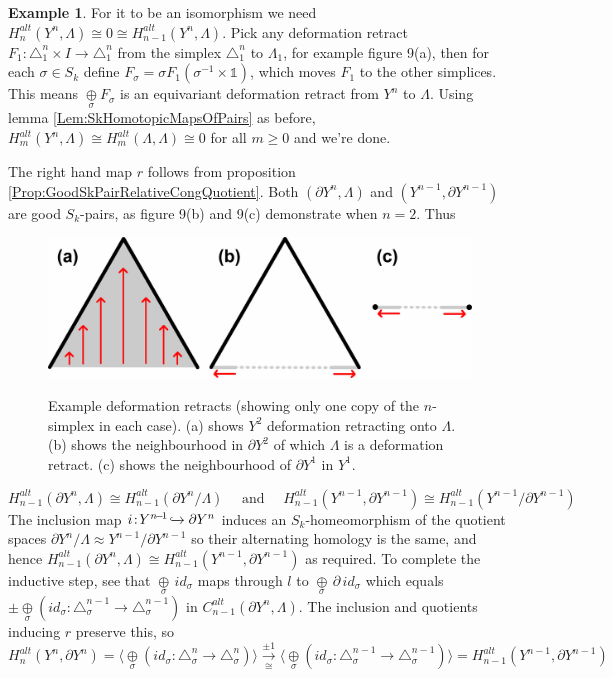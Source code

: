 \documentclass[11pt,a4paper,twoside]{article}
\theoremstyle{plain}
\theoremstyle{definition}
\theoremstyle{definition}
\theoremstyle{definition}
\theoremstyle{definition}
\newtheorem{example}[thm]{Example}
\theoremstyle{definition}
\begin{document}
\begin{example}
For it to be an isomorphism we need $H_n^{alt}(Y^n,\Lambda)\cong 0 \cong H_{n\!-\!1}^{alt}(Y^n,\Lambda)$. Pick any deformation retract $F_1\!:\!\triangle^n_1\times I\!\rightarrow\!\triangle^n_1$ from the simplex $\triangle_1^n$ to $\Lambda_1$, for example figure 9(a), then for each $\sigma\in S_k$ define $F_\sigma\!=\!\sigma F_1(\sigma^{-1}\!\times\!\mathbb{1})$, which moves $F_1$ to the other simplices. This means $\underset\sigma\oplus F_\sigma$ is an equivariant deformation retract from $Y^n$ to $\Lambda$.  Using lemma \ref{Lem:SkHomotopicMapsOfPairs} as before, $H_m^{alt}(Y^n,\Lambda)\cong H_m^{alt}(\Lambda,\Lambda)\cong0$ for all $m\geq0$ and we're done.

The right hand map $r$ follows from proposition \ref{Prop:GoodSkPairRelativeCongQuotient}. Both $(\partial Y^n,\Lambda)$ and $(Y^{n\!-\!1},\partial Y^{n\!-\!1})$ are good $S_k$-pairs, as figure 9(b) and 9(c) demonstrate when $n\!=\!2$. Thus
\begin{figure}
\centering
\includegraphics[scale=0.20]{Images/EqDefRetExist.jpg}
\label{Fig:EqDefRetExist}
\caption{Example deformation retracts (showing only one copy of the $n$-simplex in each case). (a) shows $Y^2$ deformation retracting onto $\Lambda$. (b) shows the neighbourhood in $\partial Y^2$ of which $\Lambda$ is a deformation retract. (c) shows the neighbourhood of $\partial Y^1$ in $Y^1$.}
\end{figure}
$$H_{n-1}^{alt}(\partial Y^n, \Lambda)\cong H_{n-1}^{alt}(\partial Y^n / \Lambda)\quad\text{ and }\quad H_{n-1}^{alt}(Y^{n-1},\partial Y^{n-1})\cong H_{n-1}^{alt}(Y^{n-1}/\partial Y^{n-1})$$
The inclusion map $i\!:\!Y^{n\!-\!1}\!\xhookrightarrow\!\partial Y^n$ induces an $S_k$-homeomorphism of the quotient spaces $\partial Y^n/\Lambda \approx Y^{n\!-\!1}/\partial Y^{n\!-\!1}$ so their alternating homology is the same, and hence $H_{n\!-\!1}^{alt}(\partial Y^n,\Lambda)\cong H_{n\!-\!1}^{alt}(Y^{n\!-\!1},\partial Y^{n\!-\!1})$ as required. To complete the inductive step, see that $\underset\sigma\oplus\, id_\sigma$ maps through $l$ to $\underset\sigma\oplus\, \partial\, id_\sigma$ which equals $\pm\underset\sigma\oplus(id_\sigma\!:\!\triangle^{n\!-\!1}_\sigma\!\rightarrow\!\triangle_\sigma^{n\!-\!1})$ in $C_{n\!-\!1}^{alt}(\partial Y^n,\Lambda)$. The inclusion and quotients inducing $r$ preserve this, so
$$H_n^{alt}(Y^n,\partial Y^n)= \langle\underset{\sigma}\oplus(id_\sigma\!:\!\triangle_\sigma^n\!\rightarrow\!\triangle_\sigma^n)\rangle\overset{\pm 1}{\underset\cong\longrightarrow}\langle\underset{\sigma}\oplus(id_\sigma\!:\!\triangle_\sigma^{n-1}\!\rightarrow\!\triangle_\sigma^{n-1})\rangle=H_{n-1}^{alt}(Y^{n-1},\partial Y^{n-1})$$
\end{example}
\end{document}
